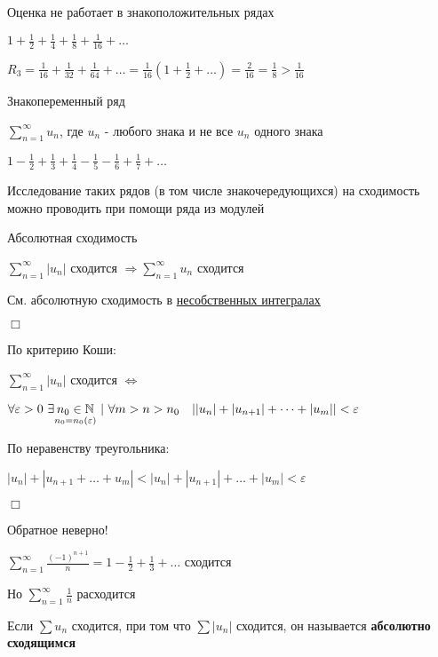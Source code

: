 \documentclass[12pt]{article}
\begin{document}
    \Nota Оценка не работает в знакоположительных рядах

    $1 + \frac{1}{2} + \frac{1}{4} + \frac{1}{8} + \frac{1}{16} + \dots$

    $R_3 = \frac{1}{16} + \frac{1}{32} + \frac{1}{64} + \dots = \frac{1}{16} (1 + \frac{1}{2} + \dots) = \frac{2}{16} = \frac{1}{8} > \frac{1}{16}$

    \Def Знакопеременный ряд

    $\sum_{n = 1}^\infty u_n$, где $u_n$ - любого знака и не все $u_n$ одного знака

    \Ex $1 - \frac{1}{2} + \frac{1}{3} + \frac{1}{4} - \frac{1}{5} - \frac{1}{6} + \frac{1}{7} + \dots$

    \Nota Исследование таких рядов (в том числе знакочередующихся) на сходимость можно проводить при помощи ряда из модулей

    \begin{MyTheorem}
        \Ths Абсолютная сходимость

        $\sum_{n = 1}^\infty |u_n|$ сходится $\Longrightarrow \sum_{n = 1}^\infty u_n$ сходится
    \end{MyTheorem}

    \Mems См. абсолютную сходимость в \href{https://pelmesh619.github.io/itmo_conspects/conspects/calculus/calculus_superconspect.pdf}{несобственных интегралах}

    \begin{MyProof}
        $\Box$

        По критерию Коши:

        $\sum_{n = 1}^\infty |u_n|$ сходится $\Longleftrightarrow$

        $\forall \varepsilon > 0 \ \exists \underset{n_0 = n_0(\varepsilon)}{n_0 \in \mathbb{N}} \ | \ \forall m > n > n_0 \quad ||u_n| + |u_{n + 1}| + \dots + |u_m|| < \varepsilon$

        По неравенству треугольника:

        $|u_n| + |u_{n + 1} + \dots + u_m| < |u_n| + |u_{n + 1}| + \dots + |u_m| < \varepsilon$

        $\Box$
    \end{MyProof}

    \Notas Обратное неверно!

    \Ex $\sum_{n = 1}^\infty \frac{(-1)^{n + 1}}{n} = 1 - \frac{1}{2} + \frac{1}{3} + \dots $ сходится

    Но $\sum_{n = 1}^\infty \frac{1}{n}$ расходится

    \Def Если $\sum u_n$ сходится, при том что $\sum |u_n|$ сходится, он называется \textbf{абсолютно сходящимся}
\end{document}

